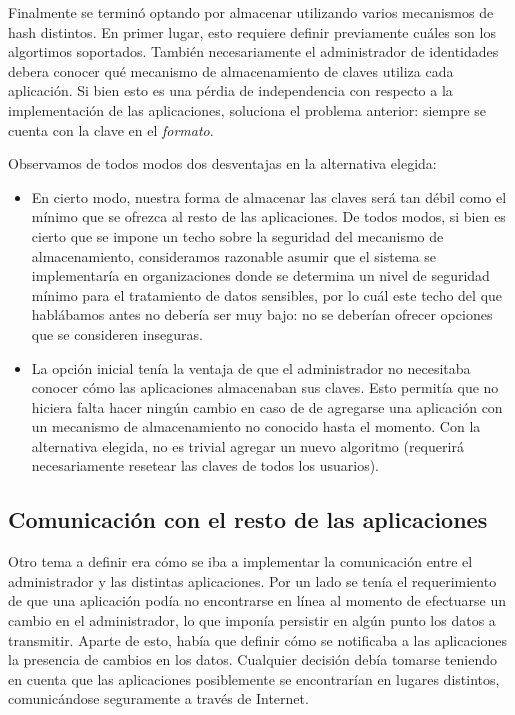 Finalmente se terminó optando por almacenar utilizando varios mecanismos de hash distintos. En primer lugar,
esto requiere definir previamente cuáles son los algortimos soportados. También necesariamente el administrador
de identidades debera conocer qué mecanismo de almacenamiento de claves utiliza cada aplicación. Si bien esto
es una pérdia de independencia con respecto a la implementación de las aplicaciones, soluciona el problema 
anterior: siempre se cuenta con la clave en el \textit{formato}.

Observamos de todos modos dos desventajas en la alternativa elegida:
\begin{itemize}
 \item  En cierto modo, nuestra forma de almacenar las claves será tan débil como el mínimo que se ofrezca al
 		resto de las aplicaciones. De todos modos, si bien es cierto que se impone un techo sobre la seguridad
 		del mecanismo de almacenamiento, consideramos razonable asumir que el sistema se implementaría en
 		organizaciones donde se determina un nivel de seguridad mínimo para el tratamiento de datos sensibles,
 		por lo cuál este techo del que hablábamos antes no debería ser muy bajo: no se deberían ofrecer opciones
 		que se consideren inseguras.
 \item  La opción inicial tenía la ventaja de que el administrador no necesitaba conocer cómo las aplicaciones
 		almacenaban sus claves. Esto permitía que no hiciera falta hacer ningún cambio en caso de de agregarse
 		una aplicación con un mecanismo de almacenamiento no conocido hasta el momento. Con la alternativa
 		elegida, no es trivial agregar un nuevo algoritmo (requerirá necesariamente resetear las claves de
 		todos los usuarios).
\end{itemize}



\subsection{Comunicación con el resto de las aplicaciones}

Otro tema a definir era cómo se iba a implementar la comunicación entre el administrador y las distintas
aplicaciones. Por un lado se tenía el requerimiento de que una aplicación podía no encontrarse en línea al 
momento de efectuarse un cambio en el administrador, lo que imponía persistir en algún punto los datos a
transmitir. Aparte de esto, había que definir cómo se notificaba a las aplicaciones la presencia de cambios en
los datos. Cualquier decisión debía tomarse teniendo en cuenta que las aplicaciones posiblemente se encontrarían
en lugares distintos, comunicándose seguramente a través de Internet.

